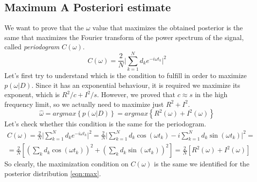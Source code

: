 \documentclass[a4paper,11pt,fleqn]{article}
\begin{document}
\subsection{Maximum A Posteriori estimate}
We want to prove that the $\omega$ value that maximizes the obtained 
posterior is the same that maximizes the Fourier transform of the power 
spectrum of the signal, called \textit{periodogram} $C(\omega)$.
\begin{equation}
    C(\omega) = \frac{2}{N} \Big| \sum_{k=1}^N d_k e^{-i\omega t_k}\Big|^2
\end{equation}
Let's first try to understand which is the condition to fulfill in order 
to maximize $p(\omega|D)$. Since it has an exponential behaviour, it is 
required we maximize its exponent, which is $R^2/c + I^2/s$. However,
we proved that $c\approx s$ in the high frequency limit, so we actually 
need to maximize just $R^2+I^2$.
\begin{equation}
    \label{eqn:max}
    \hat{\omega} = argmax\left\{p(\omega|D)\right\} = argmax\left\{R^2(\omega)+I^2(\omega)\right\}
\end{equation}
Let's check whether this condition is the same for the periodogram. 
\begin{gather*}
    C(\omega) = \frac{2}{N} \Big| \sum_{k=1}^N d_k e^{-i\omega t_k}\Big|^2 = \frac{2}{N} \Big| \sum_{k=1}^N d_k \cos(\omega t_k) -i \sum_{k=1}^N d_k \sin(\omega t_k) \Big|^2 = \\
    = \frac{2}{N} \left[\left(\sum_k d_k \cos(\omega t_k)\right)^2 + \left(\sum_k d_k \sin(\omega t_k)\right)^2\right] = \frac{2}{N}\left[R^2(\omega)+I^2(\omega)\right] 
\end{gather*}
So clearly, the maximization condition on $C(\omega)$ is the same we identified 
for the posterior distribution \ref{eqn:max}.
\end{document}
